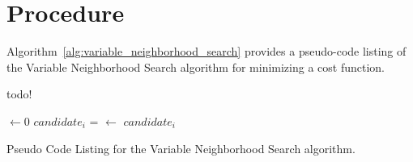 \documentclass[a4paper, 11pt]{article}
\begin{document}
\section{Procedure}
\label{sec:procedure}
Algorithm~\ref{alg:variable_neighborhood_search} provides a pseudo-code listing of the Variable Neighborhood Search algorithm for minimizing a cost function.

todo!

\begin{algorithm}[ht]
	\SetLine
	\KwIn{\NumIterations, \ProblemSize, \SearchSpace}
	\KwOut{\Best}
	\Best $\leftarrow 0$\;
	 {
		$candidate_i$ = \RandomSolution{\ProblemSize, \SearchSpace}\;
		 {
			\Best $\leftarrow$ $candidate_i$\;
		}
	}
	\Return{\Best}\;
	\caption{Pseudo Code Listing for the Variable Neighborhood Search algorithm.}
	\label{alg:variable_neighborhood_search}
\end{algorithm}

\end{document}
